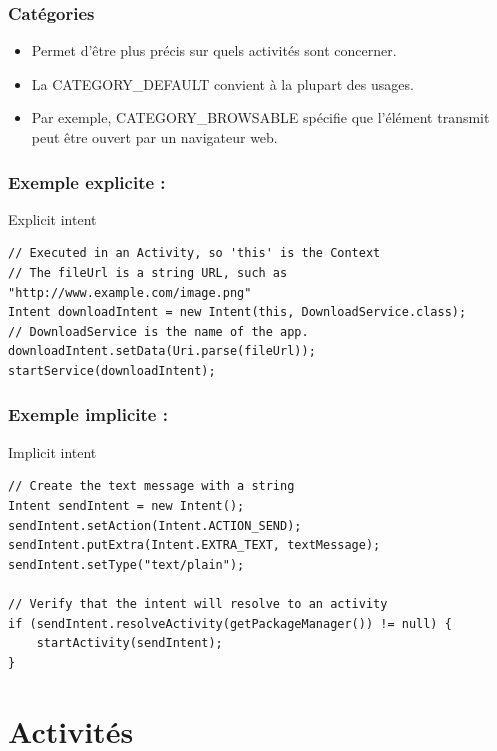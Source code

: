 \documentclass{beamer}
\begin{document}
\begin{frame}
\frametitle{Catégories}
\begin{itemize}

\item Permet d’être plus précis sur quels activités sont concerner.

\item La CATEGORY\_DEFAULT convient à la plupart des usages.

\item Par exemple, CATEGORY\_BROWSABLE spécifie que l'élément transmit peut être ouvert par un navigateur web.
\end{itemize}
\end{frame}

\begin{frame}[fragile]
\frametitle{Exemple explicite :}
\lstset{language=java}

\begin{block}{Explicit intent}
\begin{lstlisting}
// Executed in an Activity, so 'this' is the Context
// The fileUrl is a string URL, such as "http://www.example.com/image.png"
Intent downloadIntent = new Intent(this, DownloadService.class);
// DownloadService is the name of the app.
downloadIntent.setData(Uri.parse(fileUrl));
startService(downloadIntent);
\end{lstlisting}
\end{block}
\end{frame}


\begin{frame}[fragile]
\frametitle{Exemple implicite :}
\lstset{language=java}

\begin{block}{Implicit intent}
\begin{lstlisting}
// Create the text message with a string
Intent sendIntent = new Intent();
sendIntent.setAction(Intent.ACTION_SEND);
sendIntent.putExtra(Intent.EXTRA_TEXT, textMessage);
sendIntent.setType("text/plain");

// Verify that the intent will resolve to an activity
if (sendIntent.resolveActivity(getPackageManager()) != null) {
    startActivity(sendIntent);
}
\end{lstlisting}
\end{block}
\end{frame}

\section{Activités}
\end{document}
